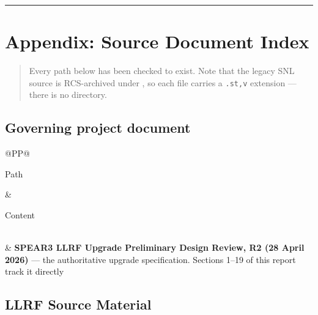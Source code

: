 \begin{center}\rule{0.5\linewidth}{0.5pt}\end{center}

\section{Appendix: Source Document Index}\label{appendix-source-document-index}

\begin{quote}
Every path below has been checked to exist. Note that the legacy SNL source is RCS-archived under , so each file carries a \texttt{.st,v} extension --- there is no  directory.
\end{quote}

\subsection{Governing project document}\label{governing-project-document}

\begin{longtable}[]{@{}P{\tabcolsep\relax}P{\tabcolsep\relax}@{}}
\toprule\noalign{}
\begin{minipage}[b]{\linewidth}\raggedright
Path
\end{minipage} & \begin{minipage}[b]{\linewidth}\raggedright
Content
\end{minipage} \\
\midrule\noalign{}
\endhead
\bottomrule\noalign{}
\endlastfoot
{} & \textbf{SPEAR3 LLRF Upgrade Preliminary Design Review, R2 (28 April 2026)} --- the authoritative upgrade specification. Sections 1--19 of this report track it directly \\
\end{longtable}

\subsection{LLRF Source Material}\label{llrf-source-material}

